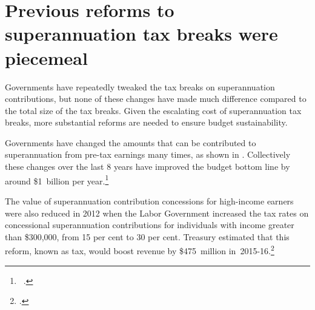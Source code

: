 \section{Previous reforms to superannuation tax breaks were piecemeal}\label{sec:SUPER-3-8}
Governments have repeatedly tweaked the tax breaks on superannuation contributions, but none of these changes have made much difference compared to the total size of the tax breaks. Given the escalating cost of superannuation tax breaks, more substantial reforms are needed to ensure budget sustainability. 

Governments have changed the amounts that can be contributed to superannuation from pre-tax earnings many times, as shown in . Collectively these changes over the last 8 years have improved the budget bottom line by around \$1~billion per year.\footnote{\gao\ \textcite{TreasurymultipleyearsBudgetPapers200809to201516}.}  

The value of superannuation contribution concessions for high-income earners were also reduced in 2012 when the Labor Government increased the tax rates on concessional superannuation contributions for individuals with income greater than \$300,000, from 15 per cent to 30 per cent. Treasury estimated that this reform, known as  tax, would boost revenue by \$475~million in~2015-16.\footcite[][41]{Treasury2012} 

